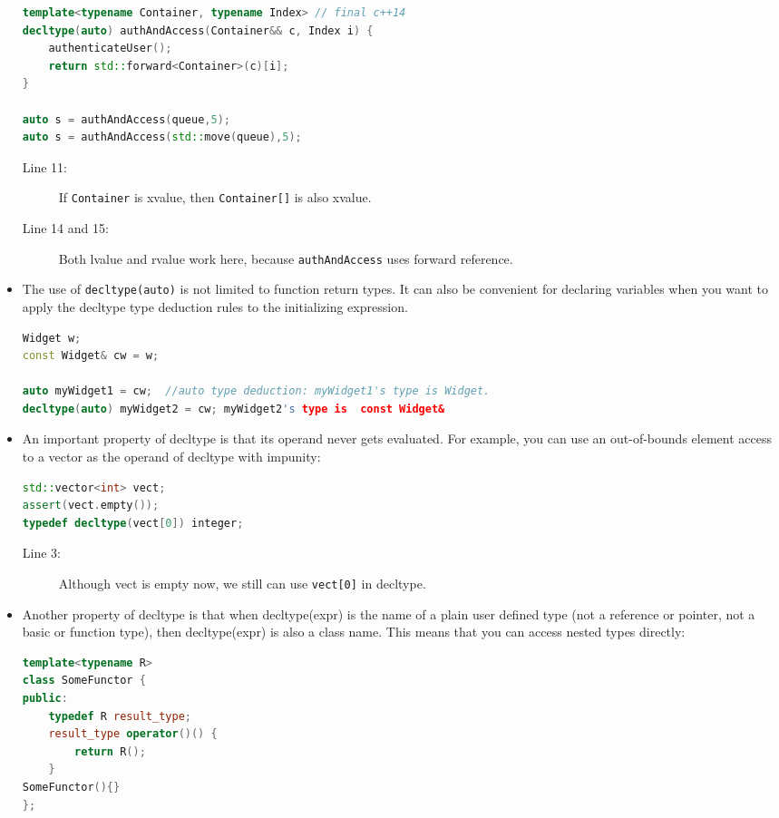 \documentclass[a4paper,11pt,twoside]{book}
\begin{document}
\begin{itemize}
\begin{lstlisting}[frame=single, language=c++, mathescape=true]
template<typename Container, typename Index> // final c++14
decltype(auto) authAndAccess(Container&& c, Index i) {
	authenticateUser();
	return std::forward<Container>(c)[i];
}

auto s = authAndAccess(queue,5);
auto s = authAndAccess(std::move(queue),5); 
\end{lstlisting}
\begin{description}
	\item[Line 11:] If \texttt{Container} is xvalue, then \texttt{Container[]} is also xvalue. 
	
	\item[Line 14 and 15:] Both lvalue and rvalue work here, because \texttt{authAndAccess} uses forward reference. 
\end{description}

	
	\item The use of \texttt{decltype(auto)} is not limited to function return types. It can also be convenient for declaring variables when you want to apply the decltype type deduction rules to the initializing expression.
\begin{lstlisting}[frame=single, language=c++, mathescape=true]
Widget w;
const Widget& cw = w;

auto myWidget1 = cw;  //auto type deduction: myWidget1's type is Widget.
decltype(auto) myWidget2 = cw; myWidget2's type is  const Widget&
\end{lstlisting}
	
	\item An important property of decltype is that its operand never gets evaluated. For example, you can use an out-of-bounds element access to a vector as the operand of decltype with impunity:
	
\begin{lstlisting}[frame=single, language=c++, mathescape=true]
std::vector<int> vect;
assert(vect.empty());
typedef decltype(vect[0]) integer; 
\end{lstlisting}

\begin{description}
	\item[Line 3:] Although vect is empty now, we still can use \texttt{vect[0]} in decltype.
\end{description}
	
	\item Another property of decltype is that when decltype(expr) is the name of a plain user defined type (not a reference or pointer, not a basic or function type), then decltype(expr) is also a class name. This means that you can access nested types directly:
\begin{lstlisting}[frame=single, language=c++, mathescape=true]
template<typename R>
class SomeFunctor {
public:
	typedef R result_type;
	result_type operator()() {
		return R();
	}
SomeFunctor(){}
};


\end{lstlisting}
\end{itemize}
\end{document}
